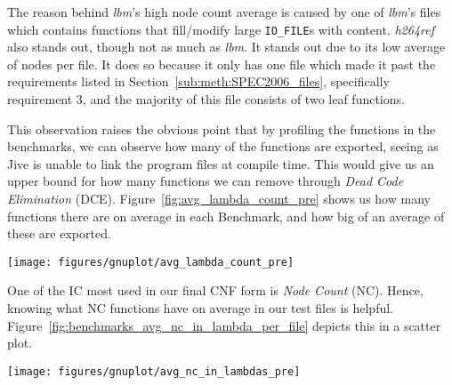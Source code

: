 The reason behind \textit{lbm}'s high node count average is caused by one of
\textit{lbm}'s files which contains functions that fill/modify large
\lstinline!IO_FILE!s with content. \textit{h264ref} also stands out, though not
as much as \textit{lbm}. It stands out due to its low average of nodes per file.
It does so because it only has one file which made it past the requirements
listed in Section~\ref{sub:meth:SPEC2006_files}, specifically requirement 3, and
the majority of this file consists of two leaf functions.

This observation raises the obvious point that by profiling the functions in the
benchmarks, we can observe how many of the functions are exported, seeing as
Jive is unable to link the program files at compile time. This would give us an
upper bound for how many functions we can remove through \textit{Dead Code
Elimination} (DCE). Figure~\ref{fig:avg_lambda_count_pre} shows us how many
functions there are on average in each Benchmark, and how big of an average of
these are exported.

\begin{centering}
	\noindent\begin{minipage}{\textwidth}
		\captionsetup{type=figure}
		\hspace{-1em}
		\texttt{[image: figures/gnuplot/avg\_lambda\_count\_pre]}
	\end{minipage}
	\label{fig:avg_lambda_count_pre}
\end{centering}

One of the IC most used in our final CNF form is \textit{Node Count} (NC).
Hence, knowing what NC functions have on average in our test files is helpful.
Figure~\ref{fig:benchmarks_avg_nc_in_lambda_per_file} depicts this in a scatter
plot.

\begin{centering}
	\noindent\begin{minipage}{\textwidth}
		\captionsetup{type=figure}
		\hspace{-1em}
		\texttt{[image: figures/gnuplot/avg\_nc\_in\_lambdas\_pre]}
	\end{minipage}
	\label{fig:benchmarks_avg_nc_in_lambda_per_file}
\end{centering}

